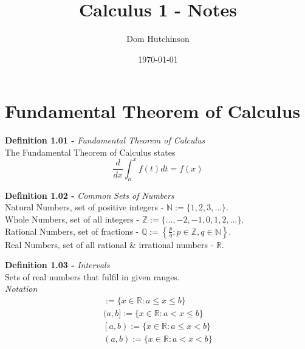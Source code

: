 \documentclass[11pt,a4paper]{article}
\begin{document}
\pagestyle{fancy}

\renewcommand{\headrulewidth}{0pt}
\setlength\parindent{0pt}

\title{Calculus 1 - Notes}
\author{Dom Hutchinson}
\date{\today}
\maketitle

\fancyhead[R]{\today}

\tableofcontents

\newpage

\section{Fundamental Theorem of Calculus}

\textbf{Definition 1.01 - }\textit{Fundamental Theorem of Calculus} \\
The Fundamental Theorem of Calculus states $$\frac{d}{dx}\int_{a}^{x} f(t) dt = f(x) $$

\textbf{Definition 1.02 - }\textit{Common Sets of Numbers} \\
Natural Numbers, set of positive integers - $\mathbb{N} := \{1, 2, 3, ...\}$. \\
Whole Numbers, set of all integers - $\mathbb{Z} := \{..., -2, -1, 0, 1, 2, ...\}$. \\
Rational Numbers, set of fractions - $\mathbb{Q} := \left\{\frac{p}{q} : p \in \mathbb{Z}, q \in \mathbb{N} \right\}$. \\
Real Numbers, set of all rational \& irrational numbers - $\mathbb{R}$. \newline

\textbf{Definition 1.03 - }\textit{Intervals} \\
Sets of real numbers that fulfil in given ranges. \\
\textit{Notation}
\begin{eqnarray*}
  [a,b] := \{x \in \mathbb{R} : a \leq x \leq b\} \\
  (a,b] := \{x \in \mathbb{R} : a < x \leq b\} \\
  \left[a,b\right) := \{x \in \mathbb{R} : a \leq x < b\} \\
  (a,b) := \{x \in \mathbb{R} : a < x < b \}
\end{eqnarray*}
\end{document}
